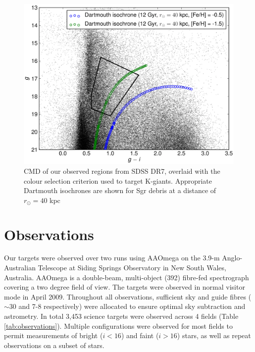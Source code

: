 \documentclass[preprint2]{aastex}
\begin{document}
\begin{figure}[h]
	\includegraphics[width=\columnwidth]{./figures/cmd.eps}
	\caption{CMD of our observed regions from SDSS DR7, overlaid with the colour selection criterion used to target K-giants. Appropriate Dartmouth isochrones \citep{Dotter;et-al_2008} are shown for Sgr debris at a distance of $r_\odot =40$ kpc \citep{Belokurov;et-al_2006}}
	\label{fig:cmd-target-selection}
\end{figure}

\section{Observations}
\label{sec:observations}

Our targets were observed over two runs using AAOmega on the 3.9-m Anglo-Australian Telescope at Siding Springs Observatory in New South Wales, Australia. AAOmega is a double-beam, multi-object (392) fibre-fed spectrograph covering a two degree field of view. The targets were observed in normal visitor mode in April 2009. Throughout all observations, sufficient sky and guide fibres ($\sim30$ and 7-8 respectively) were allocated to ensure optimal sky subtraction and astrometry. In total 3,453 science targets were observed across 4 fields (Table \ref{tab:observations}). Multiple configurations were observed for most fields to permit measurements of bright ($i < 16$) and faint ($i > 16$) stars, as well as repeat observations on a subset of stars.
\end{document}
